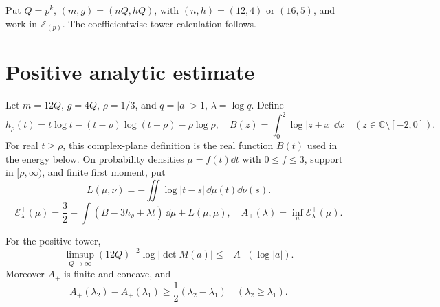 Put $Q=p^k$, $(m,g)=(nQ,hQ)$, with $(n,h)=(12,4)$ or $(16,5)$, and work in
$\mathbb Z_{(p)}$. The coefficientwise tower calculation follows.


\section{Positive analytic estimate}\label{sec:positive}

Let $m=12Q$, $g=4Q$, $\rho=1/3$, and $q=|a|>1$, $\lambda=\log q$. Define
\[
 h_\rho(t)=t\log t-(t-\rho)\log(t-\rho)-\rho\log\rho,\quad
 B(z)=\int_0^2\log|z+x|\,\dd x\quad(z\in\mathbb C\setminus[-2,0]).
\]
For real $t\ge\rho$, this complex-plane definition is the real function
$B(t)$ used in the energy below.
On probability densities $\mu=f(t)\dd t$ with $0\le f\le3$, support in
$[\rho,\infty)$, and finite first moment, put
\[
 L(\mu,\nu)=-\iint\log|t-s|\,\dd\mu(t)\dd\nu(s).
\]
\[
 {\mathcal E}^+_\lambda(\mu)=\frac32+\int(B-3h_\rho+\lambda t)\,\dd\mu
 +L(\mu,\mu),
 \quad A_+(\lambda)=\inf_\mu{\mathcal E}^+_\lambda(\mu).
\]

\begin{proposition}\label{prop:positive}
For the positive tower,
\begin{equation}
 \limsup_{Q\to\infty}(12Q)^{-2}
 \log|\det M(a)|\le-A_+(\log|a|).                           \label{eq:24}
\end{equation}
Moreover $A_+$ is finite and concave, and
\begin{equation}
 A_+(\lambda_2)-A_+(\lambda_1)
 \ge\frac12(\lambda_2-\lambda_1)\quad
 (\lambda_2\ge\lambda_1).                                  \label{eq:25}
\end{equation}
\end{proposition}

